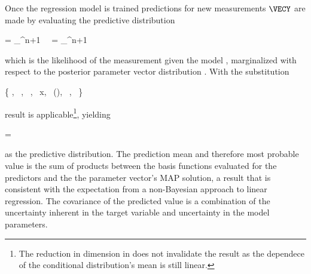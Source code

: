     Once the regression model is trained predictions for new measurements
    $\VECY$ are made by evaluating the predictive distribution

    \startformula
    \startalign[n=2,align={right,left}]
        \NC \RPREDICT = \NC
            \int_{\REALS^{n+1}}  \,
            \RPOSTERIOR \, \diff \VECW \NR
        \NC = \NC
            \int_{\REALS^{n+1}}  \,
                \GAUSS{\VECW}{\MEANVEC}{\COVMAT} \,\diff \VECW \NR
    \stopalign
    \stopformula
    
    which is the likelihood of the measurement given the model
    , marginalized with respect to the posterior
    parameter vector distribution . With the
    substitution

    \startformula
        \{ \VECX \rightarrow \VECW,~
            \VECA \rightarrow \MEANVEC,~
            \MATP \rightarrow \COVMATI,~
            \VECY \rightarrow x,~
            \MATB \rightarrow \VECPHI(\VECY),~
            \VECB {},~
            \MATQ \rightarrow \beta \}
    \stopformula

    result  is applicable\footnote{The reduction in
    dimension in  does not invalidate the result as the
    dependece of the conditional distribution's mean is still linear.},
    yielding

    \startformula
        \RPREDICT = 
    \stopformula

    as the predictive distribution. The prediction mean and therefore most
    probable value is the sum of products between the basis functions evaluated
    for the predictors and the the parameter vector's MAP solution, a result
    that is consistent with the expectation from a non-Bayesian approach to
    linear regression. The covariance of the predicted value is a combination
    of the uncertainty inherent in the target variable and uncertainty in the
    model parameters.

        {}

